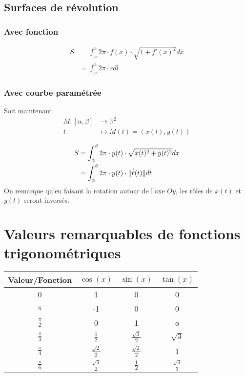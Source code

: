 \documentclass[10pt,a4paper]{book}
\newcommand{\R}{\mathbb{R}}
\DeclarePairedDelimiter\norm{\lVert}{\rVert}
\begin{document}
\section{Surfaces de révolution}

\subsection{Avec fonction}
\begin{equation*}
\begin{split}
S &= \int_a^b 2\pi \cdot f(x) \cdot \sqrt{1+f'(x)^2}dx \\
&= \int_a^b 2\pi\cdot rdl
\end{split}
\end{equation*}

\subsection{Avec courbe paramétrée}
Soit maintenant
\begin{equation*}
\begin{split}
M:[\alpha,\beta] & \rightarrow \R^2 \\
t & \mapsto M(t) = (x(t), y(t))
\end{split}
\end{equation*}

\begin{equation*}
\begin{split}
S &= \int_\alpha^\beta 2\pi \cdot y(t) \cdot \sqrt{\dot{x}(t)^2 + \dot{y}(t)^2}dx \\
&= \int_\alpha^\beta 2\pi\cdot y(t) \cdot \norm{\dot{\vec{r}}(t)} dt
\end{split}
\end{equation*}
On remarque qu'en faisant la rotation autour de l'axe $Oy$, les rôles de $x(t)$ et $y(t)$ seront inversés.


\chapter*{Valeurs remarquables de fonctions trigonométriques}

\begin{tabular}{|c|c|c|c|}
\hline
Valeur/Fonction &  $\cos(x)$ & $\sin(x)$ & $\tan(x)$\\
\hline
0 & 1 & 0 & 0 \\
\hline
$\pi$ & -1 & 0 & 0 \\
\hline
$\frac{\pi}{2}$ & 0 & 1 & \o \\
\hline
$\frac{\pi}{3}$ & $\frac{1}{2}$ & $\frac{\sqrt{3}}{2}$ & $\sqrt{3}$ \\
\hline
$\frac{\pi}{4}$ & $\frac{\sqrt{2}}{2}$ & $\frac{{\sqrt{2}}}{2}$ & 1 \\
\hline
$\frac{\pi}{6}$ & $\frac{\sqrt{3}}{2}$ & $\frac{1}{2}$ & $\frac{\sqrt{3}}{3}$ \\
\hline
\end{tabular}

\end{document}
